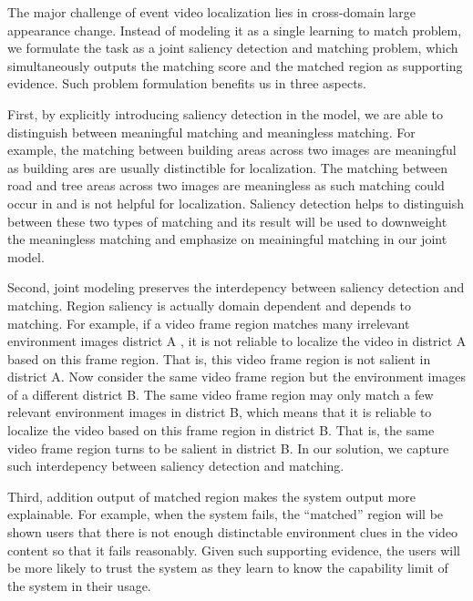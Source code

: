 The major challenge of event video localization lies in cross-domain large appearance change. 
Instead of modeling it as a single learning to match problem, we formulate the task as a joint saliency detection and matching problem, which simultaneously outputs the matching score and the matched region as supporting evidence. 
Such problem formulation benefits us in three aspects.

First, by explicitly introducing saliency detection in the model, we are able to distinguish between meaningful matching and meaningless matching. 
For example, the matching between building areas across two images are meaningful as building ares are usually distinctible for localization. 
The matching between road and tree areas across two images are meaningless as such matching could occur in and is not helpful for localization. 
Saliency detection helps to distinguish between these two types of matching and its result will be used to downweight the meaningless matching and emphasize on meainingful matching in our joint model. 

Second, joint modeling preserves the interdepency between saliency detection and matching. 
Region saliency is actually domain dependent and depends to matching. 
For example, if a video frame region matches many irrelevant environment images district A , it is not reliable to localize the video in district A based on this frame region. 
That is, this video frame region is not salient in district A. 
Now consider the same video frame region but the environment images of a different district B. 
The same video frame region may only match a few relevant environment images in district B, which means that it is reliable to localize the video based on this frame region in district B. 
That is, the same video frame region turns to be salient in district B. 
In our solution, we capture such interdepency between saliency detection and matching. 

Third, addition output of matched region makes the system output more explainable. 
For example, when the system fails, the ``matched'' region will be shown users that there is not enough distinctable environment clues in the video content so that it fails reasonably. 
Given such supporting evidence, the users will be more likely to trust the system as they learn to know the capability limit of the system in their usage. 

